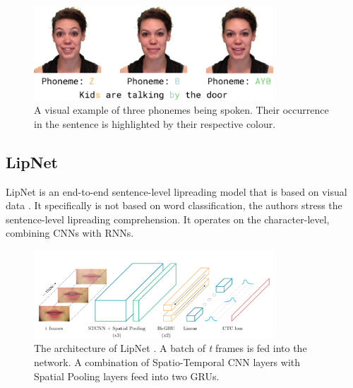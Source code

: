 
\begin{figure}
    \centering
    \includegraphics[width=0.8\textwidth]{res/png_backup/phoneex.png}
    \caption{A visual example of three phonemes being spoken. Their occurrence in the sentence is highlighted by their respective colour.}
    \label{fig:phoneme_ex}
\end{figure}

\subsection{LipNet}
\label{sec:lipnet_related}

LipNet is an end-to-end sentence-level lipreading model that is based on visual data \cite{assael2016lipnet}. It specifically is not based on word classification, the authors stress the sentence-level lipreading comprehension. It operates on the character-level, combining CNNs with RNNs.

\begin{figure}
    \centering
    \includegraphics[width=0.8\textwidth]{res/lipnet.png}
    \caption{The architecture of LipNet \cite{assael2016lipnet}. A batch of \textit{t} frames is fed into the network. A combination of Spatio-Temporal CNN layers with Spatial Pooling layers feed into two GRUs.}
    \label{fig:lipnet}
\end{figure}

